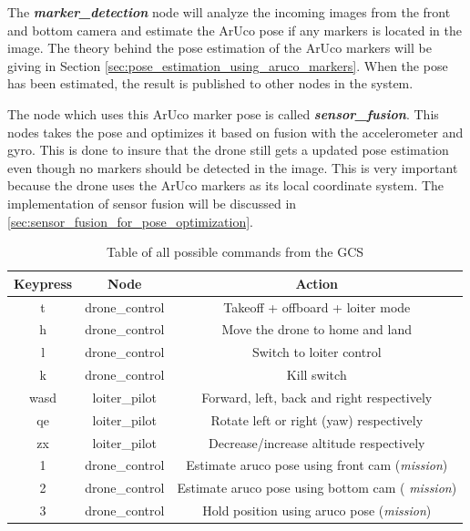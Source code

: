 \documentclass[../Head/report.tex]{subfiles}
\begin{document}
The \textit{\textbf{marker\_detection}} node will analyze the incoming images from the front and bottom camera and estimate the ArUco pose if any markers is located in the image. The theory behind the pose estimation of the ArUco markers will be giving in Section \ref{sec:pose_estimation_using_aruco_markers}. When the pose has been estimated, the result is published to other nodes in the system.

The node which uses this ArUco marker pose is called \textit{\textbf{sensor\_fusion}}. This nodes takes the pose and optimizes it based on fusion with the accelerometer and gyro. This is done to insure that the drone still gets a updated pose estimation even though no markers should be detected in the image. This is very important because the drone uses the ArUco markers as its local coordinate system. The implementation of sensor fusion will be discussed in \ref{sec:sensor_fusion_for_pose_optimization}.   

\begin{table}[H]
\centering
\begin{tabular}{ccc}
\hline
\textbf{Keypress} & \textbf{Node} & \textbf{Action}                                    \\ \hline
t                 & drone\_control & Takeoff + offboard + loiter mode         \\
h                 & drone\_control & Move the drone to home and land         \\
l                 & drone\_control & Switch to loiter control 
\\
k                 & drone\_control & Kill switch
\\
wasd              & loiter\_pilot & Forward, left, back and right respectively           \\
qe                & loiter\_pilot & Rotate left or right (yaw) respectively             \\
zx                & loiter\_pilot & Decrease/increase altitude respectively
\\
1                 & drone\_control & Estimate aruco pose using front cam (\textit{mission})
\\
2                 & drone\_control & Estimate aruco pose using bottom cam ( \textit{mission})
\\
3                 & drone\_control & Hold position using aruco pose (\textit{mission})         
\end{tabular}
\caption{Table of all possible commands from the GCS}
\label{tab:ros_commands}
\end{table}
\end{document}
